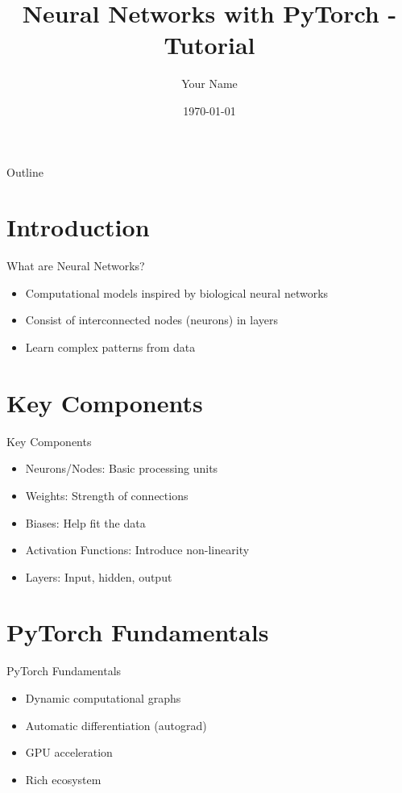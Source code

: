 \documentclass{beamer}
\title{Neural Networks with PyTorch - Tutorial}
\author{Your Name}
\date{\today}
\begin{document}
\begin{frame}
  \titlepage
\end{frame}

\begin{frame}{Outline}
  \tableofcontents
\end{frame}

\section{Introduction}
\begin{frame}{What are Neural Networks?}
  \begin{itemize}
    \item Computational models inspired by biological neural networks
    \item Consist of interconnected nodes (neurons) in layers
    \item Learn complex patterns from data
  \end{itemize}
\end{frame}

\section{Key Components}
\begin{frame}{Key Components}
  \begin{itemize}
    \item Neurons/Nodes: Basic processing units
    \item Weights: Strength of connections
    \item Biases: Help fit the data
    \item Activation Functions: Introduce non-linearity
    \item Layers: Input, hidden, output
  \end{itemize}
\end{frame}

\section{PyTorch Fundamentals}
\begin{frame}{PyTorch Fundamentals}
  \begin{itemize}
    \item Dynamic computational graphs
    \item Automatic differentiation (autograd)
    \item GPU acceleration
    \item Rich ecosystem
  \end{itemize}
\end{frame}
\end{document}
